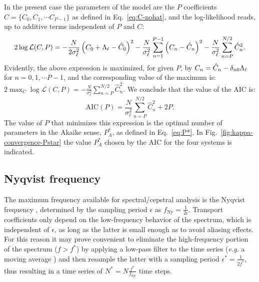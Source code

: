 In the present case the parameters of the model are the $P$ coefficients $C=\{C_{0},C_{1},\cdots C_{P-1}\}$ as defined in Eq.~\eqref{eq:C-nohat}, and the log-likelihood reads, up to additive terms independent of $P$ and $C$:
\begin{equation}
    2\log\mathcal{L}(C,P) = -\frac{N}{2\sigma_\ell^{2}}\left(C_{0}+{\mathrm\Lambda}_{\ell}-\hat{C}_{0}\right)^{2} -\frac{N}{\sigma_\ell^{2}}\sum_{n=1}^{P-1}\left(C_{n}-\hat{C}_{n}\right)^{2} -\frac{N}{\sigma_\ell^{2}}\sum_{n=P}^{N/2} \hat{C}_{n}^{2} .
\end{equation}
Evidently, the above expression is maximized, for given $P$, by $C_{n} = \hat{C}_{n} - \delta_{n0}{\mathrm\Lambda}_{\ell}$ for $n=0,1,\cdots P-1$, and the corresponding value of the maximum is: $2\max_C\log\mathcal{L}(C,P) = -\frac{N}{\sigma_\ell^{2}} \sum_{n=P}^{N/2} \hat{C}_{n}^{2}$.
We conclude that the value of the AIC is:
\begin{equation}
    \mathrm{AIC}(P) = \frac{N}{\sigma_\ell^{2}} \sum_{n=P}^{N/2} \hat{C}_{n}^{2} + 2P . \label{eq:AIC-P}
\end{equation}
The value of $P$ that minimizes this expression is the optimal number of parameters in the Akaike sense, $P_A^*$, as defined in Eq.~\eqref{eq:P*}.
In Fig.~\ref{fig:kappa-convergence-Pstar} the value $P_A^*$ chosen by the AIC for the four systems is indicated.


\subsection{Nyqvist frequency}  \label{sec:cepstral-nyqvist}
The maximum frequency available for spectral/cepstral analysis is the Nyqvist frequency \cite{Oppenheim1999}, determined by the sampling period $\epsilon$ as $f_{\mathrm{Ny}}=\frac{1}{2\epsilon}$. Transport coefficients only depend on the low-frequency behavior of the spectrum, which is independent of $\epsilon$, as long as the latter is small enough as to avoid aliasing effects. For this reason it may prove convenient to eliminate the high-frequency portion of the spectrum ($f>f^*$) by applying a low-pass filter to the time series (\emph{e.g.} a moving average \cite{MovingAverage}) and then resample the latter with a sampling period $\epsilon^*=\frac{1}{2f^*}$, thus resulting in a time series of $N^*=N\frac{f^*}{f_{\mathrm{Ny}}}$ time steps.


